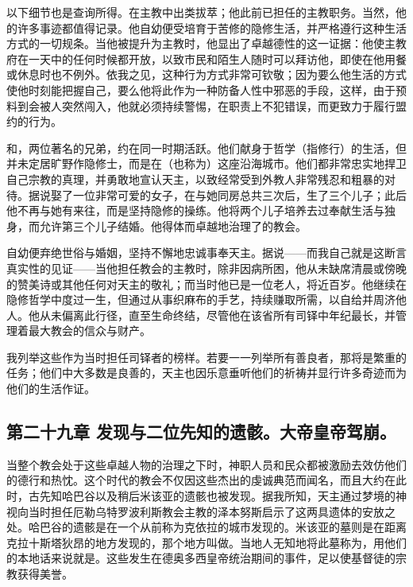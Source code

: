 以下细节也是查询所得。在主教中出类拔萃；他此前已担任的主教职务。当然，他的许多事迹都值得记录。他自幼便受培育于苦修的隐修生活，并严格遵行这种生活方式的一切规条。当他被提升为主教时，他显出了卓越德性的这一证据：他使主教府在一天中的任何时候都开放，以致市民和陌生人随时可以拜访他，即使在他用餐或休息时也不例外。依我之见，这种行为方式非常可钦敬；因为要么他生活的方式使他时刻能把握自己，要么他将此作为一种防备人性中邪恶的手段，这样，由于预料到会被人突然闯入，他就必须持续警惕，在职责上不犯错误，而更致力于履行盟约的行为。\par

和，两位著名的兄弟，约在同一时期活跃。他们献身于哲学（指修行）的生活，但并未定居旷野作隐修士，而是在（也称为）这座沿海城市。他们都非常忠实地捍卫自己宗教的真理，并勇敢地宣认天主，以致经常受到外教人非常残忍和粗暴的对待。据说娶了一位非常可爱的女子，在与她同房总共三次后，生了三个儿子；此后他不再与她有来往，而是坚持隐修的操练。他将两个儿子培养去过奉献生活与独身，而允许第三个儿子结婚。他得体而卓越地治理了的教会。\par

自幼便弃绝世俗与婚姻，坚持不懈地忠诚事奉天主。据说——而我自己就是这断言真实性的见证——当他担任教会的主教时，除非因病所困，他从未缺席清晨或傍晚的赞美诗或其他任何对天主的敬礼；而当时他已是一位老人，将近百岁。他继续在隐修哲学中度过一生，但通过从事织麻布的手艺，持续赚取所需，以自给并周济他人。他从未偏离此行径，直至生命终结，尽管他在该省所有司铎中年纪最长，并管理着最大教会的信众与财产。\par

我列举这些作为当时担任司铎者的榜样。若要一一列举所有善良者，那将是繁重的任务；他们中大多数是良善的，天主也因乐意垂听他们的祈祷并显行许多奇迹而为他们的生活作证。\par


\subsection{第二十九章 发现与二位先知的遗骸。大帝皇帝驾崩。}

当整个教会处于这些卓越人物的治理之下时，神职人员和民众都被激励去效仿他们的德行和热忱。这个时代的教会不仅因这些杰出的虔诚典范而闻名，而且大约在此时，古先知哈巴谷以及稍后米该亚的遗骸也被发现。据我所知，天主通过梦境的神视向当时担任厄勒乌特罗波利斯教会主教的泽本努斯启示了这两具遗体的安放之处。哈巴谷的遗骸是在一个从前称为克依拉的城市发现的。米该亚的墓则是在距离克拉十斯塔狄昂的地方发现的，那个地方叫做。当地人无知地将此墓称为，用他们的本地话来说就是。这些发生在德奥多西皇帝统治期间的事件，足以使基督徒的宗教获得美誉。\par

